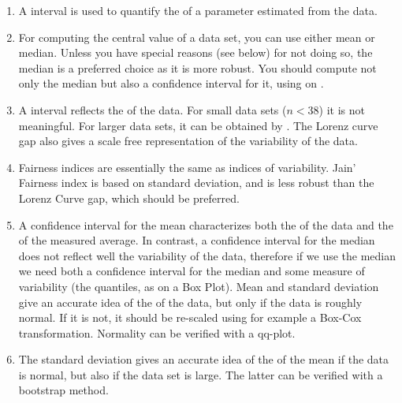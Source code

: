 \begin{enumerate}

\item A  interval is used to quantify the
     of a parameter estimated from the data.

\item For computing the central value of a data set, you
    can use either mean or median. Unless you have special
    reasons (see below) for not doing so, the median is a
    preferred choice as it is more robust. You should
    compute not only the median but also a confidence
    interval for it, using  on
    .


\item A  interval reflects the
     of the data. For small data sets ($n
    <  38$) it is not meaningful. For larger data sets, it
    can be obtained by . The Lorenz
    curve gap also gives a scale free representation of the
    variability of the data.

\item Fairness indices are essentially the same as indices
    of variability. Jain' Fairness index is based on
    standard deviation, and is less robust than the Lorenz
    Curve gap, which should be preferred.

\item A confidence interval for the mean characterizes both
    the  of the data and the
     of the measured average. In contrast, a
    confidence interval for the median does not reflect
    well the variability of the data, therefore if we use
    the median we need both a confidence interval for the
    median and some measure of variability (the quantiles,
    as on a Box Plot). Mean and standard deviation give an
    accurate idea of the  of the data, but
    only if the data is roughly normal. If it is not, it
    should be re-scaled using for example a Box-Cox
    transformation. Normality can be verified with a
    qq-plot.

\item The standard deviation gives an accurate idea of the
     of the mean if the data is normal, but
    also if the data set is large. The latter can be
    verified with a bootstrap method.


\end{enumerate}
